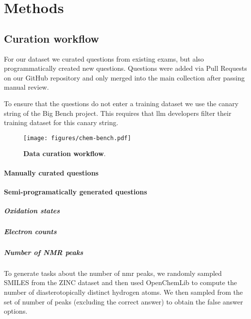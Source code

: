 \documentclass[11pt, oneside]{article}
\begin{document}



\section{Methods}

\subsection{Curation workflow}\label{sec:curation}
For our dataset we curated questions from existing exams, but also programmatically created new questions.
Questions were added via Pull Requests on our GitHub repository and only merged into the main collection after passing manual review.

To ensure that the questions do not enter a training dataset we use the canary string of the Big Bench project.
This requires that \Gls{llm} developers filter their training dataset for this canary string.

\begin{figure}
    \texttt{[image: figures/chem-bench.pdf]}
    \caption{\textbf{Data curation workflow}.}
\end{figure}

\paragraph{Manually curated questions}

\paragraph{Semi-programatically generated questions}

\subparagraph{Oxidation states}

\subparagraph{Electron counts}

\subparagraph{Number of NMR peaks} To generate tasks about the number of \gls{nmr} peaks, we randomly sampled SMILES from the ZINC dataset and then used OpenChemLib\cite{openchemlib} to compute the number of diasterotopically distinct hydrogen atoms.
We then sampled from the set of number of peaks (excluding the correct answer) to obtain the false answer options.
\end{document}
